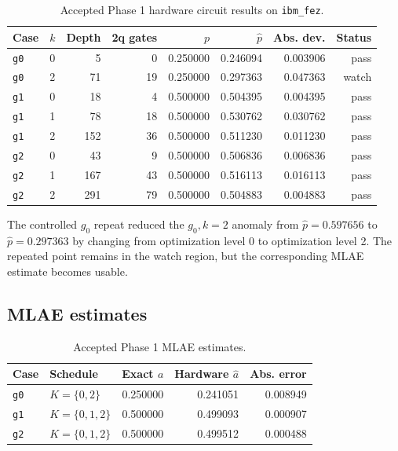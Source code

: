 \begin{table}[h]
\centering
\begin{tabular}{llrrrrrr}
\toprule
Case & \(k\) & Depth & 2q gates & \(p\) & \(\hat{p}\) & Abs. dev. & Status \\
\midrule
\texttt{g0} & 0 & 5 & 0 & 0.250000 & 0.246094 & 0.003906 & pass \\
\texttt{g0} & 2 & 71 & 19 & 0.250000 & 0.297363 & 0.047363 & watch \\
\texttt{g1} & 0 & 18 & 4 & 0.500000 & 0.504395 & 0.004395 & pass \\
\texttt{g1} & 1 & 78 & 18 & 0.500000 & 0.530762 & 0.030762 & pass \\
\texttt{g1} & 2 & 152 & 36 & 0.500000 & 0.511230 & 0.011230 & pass \\
\texttt{g2} & 0 & 43 & 9 & 0.500000 & 0.506836 & 0.006836 & pass \\
\texttt{g2} & 1 & 167 & 43 & 0.500000 & 0.516113 & 0.016113 & pass \\
\texttt{g2} & 2 & 291 & 79 & 0.500000 & 0.504883 & 0.004883 & pass \\
\bottomrule
\end{tabular}
\caption{Accepted Phase 1 hardware circuit results on \texttt{ibm\_fez}.}
\label{tab:accepted-circuits}
\end{table}

The controlled \(g_0\) repeat reduced the \(g_0,k=2\) anomaly from
\(\hat{p}=0.597656\) to \(\hat{p}=0.297363\) by changing from optimization level
0 to optimization level 2. The repeated point remains in the watch region, but
the corresponding MLAE estimate becomes usable.

\subsection{MLAE estimates}

\begin{table}[h]
\centering
\begin{tabular}{llrrr}
\toprule
Case & Schedule & Exact \(a\) & Hardware \(\hat{a}\) & Abs. error \\
\midrule
\texttt{g0} & \(K=\{0,2\}\) & 0.250000 & 0.241051 & 0.008949 \\
\texttt{g1} & \(K=\{0,1,2\}\) & 0.500000 & 0.499093 & 0.000907 \\
\texttt{g2} & \(K=\{0,1,2\}\) & 0.500000 & 0.499512 & 0.000488 \\
\bottomrule
\end{tabular}
\caption{Accepted Phase 1 MLAE estimates.}
\label{tab:mlae-estimates}
\end{table}

